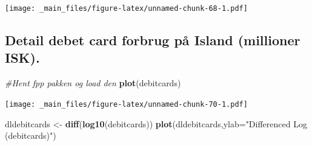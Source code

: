 \documentclass[]{book}
\newenvironment{Shaded}{\begin{snugshade}}{\end{snugshade}}
\newcommand{\CommentTok}[1]{\textcolor[rgb]{0.56,0.35,0.01}{\textit{#1}}}
\newcommand{\DataTypeTok}[1]{\textcolor[rgb]{0.13,0.29,0.53}{#1}}
\newcommand{\DecValTok}[1]{\textcolor[rgb]{0.00,0.00,0.81}{#1}}
\newcommand{\KeywordTok}[1]{\textcolor[rgb]{0.13,0.29,0.53}{\textbf{#1}}}
\newcommand{\NormalTok}[1]{#1}
\newcommand{\OperatorTok}[1]{\textcolor[rgb]{0.81,0.36,0.00}{\textbf{#1}}}
\newcommand{\StringTok}[1]{\textcolor[rgb]{0.31,0.60,0.02}{#1}}
\begin{document}
\begin{Shaded}
\end{Shaded}

\texttt{[image: \_main\_files/figure-latex/unnamed-chunk-68-1.pdf]}

\hypertarget{detail-debet-card-forbrug-pa-island-millioner-isk.}{%
\subsection{Detail debet card forbrug på Island (millioner ISK).}\label{detail-debet-card-forbrug-pa-island-millioner-isk.}}

\begin{Shaded}
\begin{Highlighting}[]
\CommentTok{#Hent fpp pakken og load den}
\KeywordTok{plot}\NormalTok{(debitcards)}
\end{Highlighting}
\end{Shaded}

\texttt{[image: \_main\_files/figure-latex/unnamed-chunk-70-1.pdf]}

\begin{Shaded}
\begin{Highlighting}[]
\NormalTok{dldebitcards <-}\StringTok{ }\KeywordTok{diff}\NormalTok{(}\KeywordTok{log10}\NormalTok{(debitcards))}
\KeywordTok{plot}\NormalTok{(dldebitcards,}\DataTypeTok{ylab=}\StringTok{"Differenced Log (debitcards)"}\NormalTok{)}
\end{Highlighting}
\end{Shaded}
\end{document}
